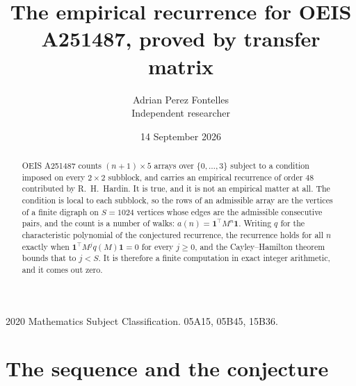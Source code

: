 \documentclass[11pt,a4paper]{article}
\title{The empirical recurrence for OEIS A251487, proved by transfer matrix}
\author{Adrian Perez Fontelles\\ \small Independent researcher}
\date{14 September 2026}
\theoremstyle{plain}
\theoremstyle{definition}
\begin{document}
\maketitle

\begin{abstract}
OEIS A251487 counts $(n+1)\times5$ arrays over $\{0,\dots,3\}$ subject to a condition imposed on
every $2\times2$ subblock, and carries an empirical recurrence of order $48$ contributed
by R.~H.~Hardin. It is true, and it is not an empirical matter at all. The condition is local
to each subblock, so the rows of an admissible array are the vertices of a finite digraph
on $S=1024$ vertices whose edges are the admissible consecutive pairs, and the count is a
number of walks: $a(n)=\mathbf{1}^{\!\top}M^{n}\mathbf{1}$. Writing $q$
for the characteristic polynomial of the conjectured recurrence, the recurrence holds for all
$n$ exactly when $\mathbf{1}^{\!\top}M^{j}q(M)\mathbf{1}=0$ for every $j\ge0$, and the
Cayley--Hamilton theorem bounds that to $j<S$. It is therefore a finite computation in exact
integer arithmetic, and it comes out zero.
\end{abstract}

\noindent\small 2020 Mathematics Subject Classification. 05A15, 05B45, 15B36.\normalsize

\section{The sequence and the conjecture}
\end{document}
